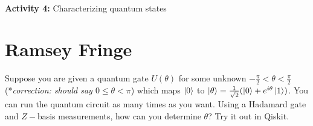 \documentclass{article}
\begin{document}
\\
{\large \textbf{Activity 4:} Characterizing quantum states \\

\section*{Ramsey Fringe}
Suppose you are given a quantum gate $U(\theta)$ for some unknown $-\frac{\pi}{2} < \theta < \frac{\pi}{2}$ (*\textit{correction: should say $0 \leq \theta < \pi$}) which maps $\ket{0}$ to $\ket{\theta} = \frac{1}{\sqrt{2}}(\ket{0}+e^{i\theta}\ket{1})$. You can run the quantum circuit as many times as you want. Using a Hadamard gate and $Z-$basis measurements, how can you determine $\theta$? Try it out in Qiskit.

}
\end{document}
